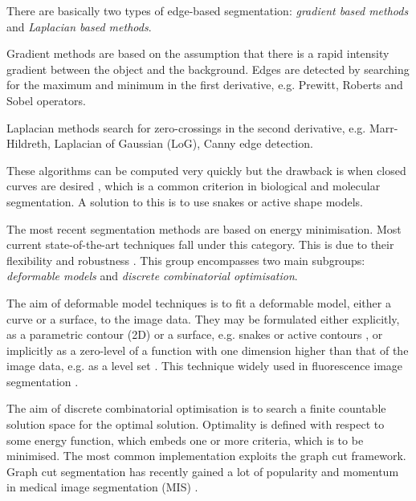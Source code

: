 \begin{definition}
	There are basically two types of edge-based segmentation: \textit{gradient based methods} and \textit{Laplacian based methods}.
	
	Gradient methods are based on the assumption that there is a rapid intensity gradient between the object and the background.
	Edges are detected by searching for the maximum and minimum in the first derivative, e.g. Prewitt, Roberts and Sobel operators.
	
	Laplacian methods search for zero-crossings in the second derivative, e.g. Marr-Hildreth, Laplacian of Gaussian (LoG), Canny edge detection.
	
	These algorithms can be computed very quickly but the drawback is when closed curves are desired \citep{Bengtsson2004}, which is a common criterion in biological and molecular segmentation.
	A solution to this is to use snakes or active shape models.
\end{definition}

\begin{definition}
	The most recent segmentation methods are based on energy minimisation.
	Most current state-of-the-art techniques fall under this category.
	This is due to their flexibility and robustness \citep{Danek2012}.
	This group encompasses two main subgroups: \textit{deformable models} and \textit{discrete combinatorial optimisation}.
	
	The aim of deformable model techniques is to fit a deformable model, either a curve or a surface, to the image data.
	They may be formulated either explicitly, as a parametric contour (2D) or a surface, e.g. snakes \citep{Kass1988} or active contours \citep{Caselles1997,Li2009,Cheng2009}, or implicitly as a zero-level of a function with one dimension higher than that of the image data, e.g. as a level set \citep{Osher2003}.
	This technique widely used in fluorescence image segmentation \citep{Dzyubachyk2008,Ortiz2001,Dufour2005,Dzyubachyk2010,Boukari2014,Maska2007}.
	
	The aim of discrete combinatorial optimisation is to search a finite countable solution space for the optimal solution.
	Optimality is defined with respect to some energy function, which embeds one or more criteria, which is to be minimised.
	The most common implementation exploits the graph cut framework.
	Graph cut segmentation has recently gained a lot of popularity and momentum in medical image segmentation (MIS) \citep{Danek2009,Chen2008,Kofahi2010,Kong2011,Yang2009,Zhang2014,Liu2008,Vu2008}.
\end{definition}

